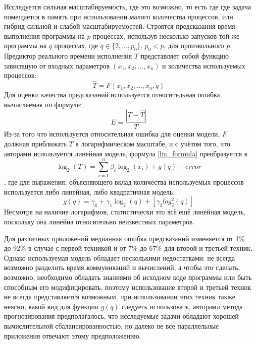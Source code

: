 Исследуется сильная масштабируемость, где это возможно, то есть где где задача помещается в память при использовании малого количества процессов, или гибрид сильной и слабой масштабируемостей. Строятся предсказания время выполнения программы на \(p\) процессах, используя несколько запусков той же программы на \(q\) процессах, где \(q \in \{2,\ldots, p_0\},\,p_0 < p\), для произвольного \(p\). Предиктор реального времени исполнения \(T\) представляет собой функцию зависящую от входных параметров \((x_1, x_2, \ldots, x_n)\) и количества используемых процессов:
\begin{equation}\label{lin_formula}
\hat{T} = F(x_1, x_2, \ldots, x_n, q)
\end{equation}
Для оценки качества предсказаний используется относительная ошибка, вычисляемая по формуле:
\begin{equation}
E = \frac{|T - \hat{T}|}{T}
\end{equation}
Из-за того что используется относительная ошибка для оценки модели, \(F\) должная приближать \(T\) в логарифмическом масштабе, и с учётом того, что авторами используется линейная модель, формула \ref{lin_formula} преобразуется в
\begin{equation}
\log_2{(T)} = \sum_{i=1}^{n}{\beta_i\log_2{(x_i)}} + g(q) + error
\end{equation}
, где для выражения, объясняющего вклад количества используемых процессов используется либо линейная, либо квадратичная модель:
\begin{equation}
g(q) = \gamma_0 + \gamma_1\log_2(q) + [\gamma_2log_2^2(q)]
\end{equation}
Несмотря на наличие логарифмов, статистически это всё ещё линейная модель, поскольку она линейна относительно неизвестных параметров.

Для различных приложений медианная ошибка предсказаний изменяется от 1\% до 92\% в случае с первой техникой и от 7\% до 67\% для второй и третьей техник. Однако используемая модель обладает несколькими недостатками: не всегда возможно разделить время коммуникаций и вычислений, а чтобы это сделать, возможно, необходимо обладать знаниями об исходном коде программы или быть способным его модифицировать, поэтому использование второй и третьей техник не всегда представляется возможным, при использовании этих техник также неясно, какой вид для функции \(g(q)\) следуеть использовать, авторами метода прогнозирования предполагалось, что исследуемые задачи обладают хорошей вычислительной сбалансированностью, но далеко не все параллельные приложения отвечают этому предположению.


